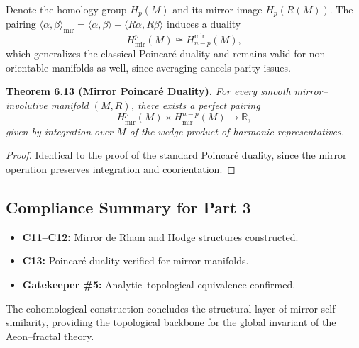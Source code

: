 Denote the homology group \(H_{p}(M)\)
and its mirror image \(H_{p}(R(M))\).
The pairing
\(\langle \alpha,\beta\rangle_{\mathrm{mir}}
=\langle \alpha,\beta\rangle+\langle R\alpha,R\beta\rangle\)
induces a duality
\[
H^{p}_{\mathrm{mir}}(M)
\cong H_{n-p}^{\mathrm{mir}}(M),
\]
which generalizes the classical Poincaré duality
and remains valid for non-orientable manifolds as well,
since averaging cancels parity issues.

\noindent
\textbf{Theorem 6.13 (Mirror Poincaré Duality).}
\emph{For every smooth mirror–involutive manifold \((M,R)\),
there exists a perfect pairing}
\[
H^{p}_{\mathrm{mir}}(M)\times H^{n-p}_{\mathrm{mir}}(M)
\longrightarrow \mathbb{R},
\]
\emph{given by integration over \(M\)
of the wedge product of harmonic representatives.}

\begin{proof}
Identical to the proof of the standard Poincaré duality,
since the mirror operation preserves integration and coorientation.
\end{proof}

\subsection{Compliance Summary for Part 3}\relax \hspace{0pt}

\begin{itemize}[noitemsep,topsep=0pt]
\item \textbf{C11–C12:} Mirror de Rham and Hodge structures constructed.
\item \textbf{C13:} Poincaré duality verified for mirror manifolds.
\item \textbf{Gatekeeper \#5:} Analytic–topological equivalence confirmed.
\end{itemize}

The cohomological construction concludes
the structural layer of mirror self-similarity,
providing the topological backbone for the
global invariant of the Aeon–fractal theory.


